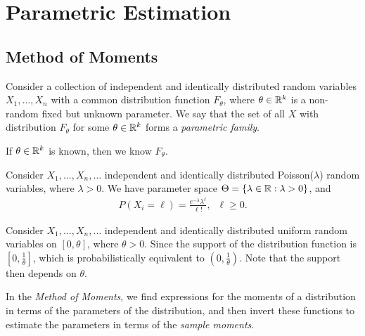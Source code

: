 \section{Parametric Estimation}

\subsection{Method of Moments}

\begin{defn}
    Consider a collection of independent and identically distributed random variables $X_1, \ldots, X_n$ with a common distribution function $F_{\theta}$, where $\theta \in \mathbb{R}^k$ is a non-random fixed but unknown parameter. We say that the set of all $X$ with distribution $F_{\theta}$ for some $\theta \in \mathbb{R}^k$ forms a \emph{parametric family}.
\end{defn}

\begin{rmk}
    If $\theta \in \mathbb{R}^{k}$ is known, then we know $F_{\theta}$.
\end{rmk}

\begin{exmp}
    Consider $X_1, \ldots, X_n, \ldots$ independent and identically distributed Poisson($\lambda$) random variables, where $\lambda > 0$. We have parameter space $\Theta = \{\lambda \in \mathbb{R}: \lambda > 0\}$, and
    \begin{align*}
        P(X_i = \ell) = \frac{e^{-\lambda}\lambda^{\ell}}{\ell!},\;\;\ell \geq 0.
    \end{align*}
\end{exmp}

\begin{exmp}
    Consider $X_1, \ldots, X_n, \ldots$ independent and identically distributed uniform random variables on $[0, \theta]$, where $\theta > 0$. Since the support of the distribution function is $[0, \frac{1}{\theta}]$, which is probabilistically equivalent to $(0, \frac{1}{\theta})$. Note that the support then depends on $\theta$.
\end{exmp}

\begin{defn}
    In the \emph{Method of Moments}, we find expressions for the moments of a distribution in terms of the parameters of the distribution, and then invert these functions to estimate the parameters in terms of the \emph{sample moments}.
\end{defn}


